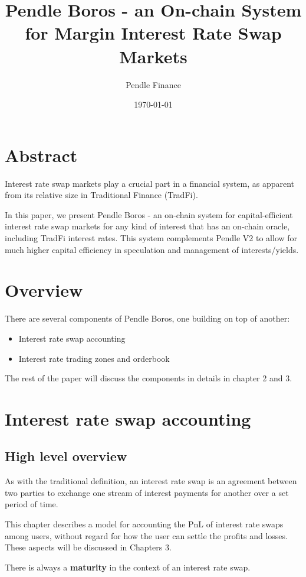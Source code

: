 \documentclass{article}%
\title{Pendle Boros - an On-chain System \\ for Margin Interest Rate Swap Markets}
\author{Pendle Finance}
\date{\today}
\begin{document}
\maketitle

\section*{Abstract}
Interest rate swap markets play a crucial part in a financial system, as apparent from its relative size in Traditional Finance (TradFi).

In this paper, we present Pendle Boros - an on-chain system for capital-efficient interest rate swap markets for any kind of interest that has an on-chain oracle, including TradFi interest rates. This system complements Pendle V2 to allow for much higher capital efficiency in speculation and management of interests/yields.

\section{Overview}
There are several components of Pendle Boros, one building on top of another:
\begin{itemize}
    \item Interest rate swap accounting
    \item Interest rate trading zones and orderbook
\end{itemize}

The rest of the paper will discuss the components in details in chapter 2 and 3.

\section{Interest rate swap accounting}
\subsection{High level overview}
As with the traditional definition, an interest rate swap is an agreement between two parties to exchange one stream of interest payments for another over a set period of time.

This chapter describes a model for accounting the PnL of interest rate swaps among users, without regard for how the user can settle the profits and losses. These aspects will be discussed in Chapters 3.

There is always a \textbf{maturity} in the context of an interest rate swap.
\end{document}
